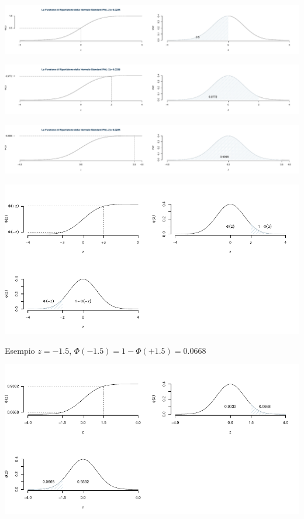 \documentclass[
  11pt,
]{book}
\theoremstyle{mytheoremstyle}
\theoremstyle{mydefstyle}
\begin{document}
\begin{center}\includegraphics{Appunti_di_Statistica_2025_files/figure-latex/07c-Normale-33-3} \end{center}

\begin{center}\includegraphics{Appunti_di_Statistica_2025_files/figure-latex/07c-Normale-33-4} \end{center}

\begin{center}\includegraphics{Appunti_di_Statistica_2025_files/figure-latex/07c-Normale-33-5} \end{center}

\begin{center}\includegraphics{Appunti_di_Statistica_2025_files/figure-latex/07c-Normale-9,-1} \end{center}

Esempio \(z=-1.5\), \(\Phi(-1.5)=1-\Phi(+1.5)=0.0668\)

\begin{center}\includegraphics{Appunti_di_Statistica_2025_files/figure-latex/07c-Normale-10,-1} \end{center}
\end{document}

